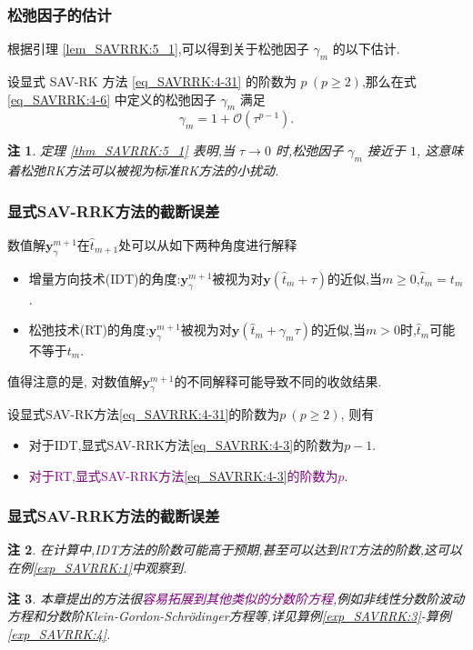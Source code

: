 \documentclass[aspectratio=169]{beamer}
\newtheorem{remark}{注}[section] %
\numberwithin{theorem}{section} %
\numberwithin{equation}{section}%
\numberwithin{figure}{section}%
\numberwithin{table}{section}%
\begin{document}
\begin{frame}\frametitle{松弛因子的估计}

	\noindent 根据引理 \ref{lem_SAVRRK:5_1},可以得到关于松弛因子 $\gamma_m$ 的以下估计.

	\begin{theorem}\label{thm_SAVRRK:5_1}
	设显式 SAV-RK 方法 \eqref{eq_SAVRRK:4-31} 的阶数为 $p~(p \geq 2)$,那么在式 \eqref{eq_SAVRRK:4-6} 中定义的松弛因子 $\gamma_m$ 满足
	\begin{equation}\label{eq_SAVRRK:5_3}
	\gamma_m=1+\mathcal{O}(\tau^{p-1}).
	\end{equation}
	\end{theorem}	
	\begin{remark}\label{rk_SAVRRK:5_1}
		定理 \ref{thm_SAVRRK:5_1} 表明,当 $\tau\rightarrow 0$ 时,松弛因子 $\gamma_m$ 接近于 $1$,
		这意味着松弛RK方法可以被视为标准RK方法的小扰动.
		\end{remark}
\end{frame}
\begin{frame}\frametitle{显式SAV-RRK方法的截断误差}
	\noindent 数值解$\bm{y}_\gamma^{m+1}$在$\hat{t}_{m+1}$处可以从如下两种角度进行解释\cite{ketchesonRelaxationRungeKutta2019}%
	\begin{itemize}
	\item 增量方向技术(IDT)的角度:\quad$\bm{y}_\gamma^{m+1}$被视为对$\bm{y}\left(\hat{t}_m+\tau\right)$的近似,当$m \geq 0$,$\hat{t}_m=t_m$.
	\item 松弛技术(RT)的角度:\quad$\bm{y}_\gamma^{m+1}$被视为对$\bm{y}\left(\hat{t}_m+\gamma_m \tau\right)$的近似,当$m>0$时,$\hat{t}_m$可能不等于$t_m$.
	\end{itemize}
	\noindent 值得注意的是, 对数值解$\bm{y}_\gamma^{m+1}$的不同解释可能导致不同的收敛结果.
	\begin{theorem}\label{thm_SAVRRK:5_4}
		设显式SAV-RK方法\eqref{eq_SAVRRK:4-31}的阶数为$p~(p \geq 2)$, 则有
		\begin{itemize}
		\item 对于IDT,显式SAV-RRK方法\eqref{eq_SAVRRK:4-3}的阶数为$p-1$.
		\item \textcolor{purple}{对于RT,显式SAV-RRK方法\eqref{eq_SAVRRK:4-3}的阶数为$p$}.
		\end{itemize}
		\end{theorem}
	\end{frame}

\begin{frame}\frametitle{显式SAV-RRK方法的截断误差}
	
	\begin{remark}\label{rk_SAVRRK:5_5}
		在计算中,IDT方法的阶数可能高于预期,甚至可以达到RT方法的阶数,这可以在例\ref{exp_SAVRRK:1}中观察到.
		\end{remark}
		\begin{remark}\label{rk_SAVRRK:5_6}
			本章提出的方法很\textcolor{purple}{容易拓展到其他类似的分数阶方程},例如非线性分数阶波动方程和分数阶Klein-Gordon-Schr{\"o}dinger方程等,详见算例\ref{exp_SAVRRK:3}-算例\ref{exp_SAVRRK:4}.
			\end{remark}
\end{frame}
\end{document}
